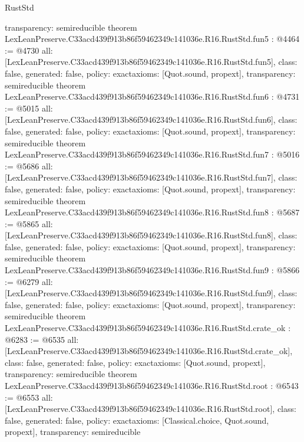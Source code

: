 \begin{lexlean}{RustStd}
\begin{coremodule}
{  transparency: semireducible
}
theorem LexLeanPreserve.C33acd439f913b86f59462349c141036e.R16.RustStd.fun5 : @4464 := @4730 {
  all: [LexLeanPreserve.C33acd439f913b86f59462349c141036e.R16.RustStd.fun5],
  class: false,
  generated: false,
  policy: exact{axioms: [Quot.sound, propext]},
  transparency: semireducible
}
theorem LexLeanPreserve.C33acd439f913b86f59462349c141036e.R16.RustStd.fun6 : @4731 := @5015 {
  all: [LexLeanPreserve.C33acd439f913b86f59462349c141036e.R16.RustStd.fun6],
  class: false,
  generated: false,
  policy: exact{axioms: [Quot.sound, propext]},
  transparency: semireducible
}
theorem LexLeanPreserve.C33acd439f913b86f59462349c141036e.R16.RustStd.fun7 : @5016 := @5686 {
  all: [LexLeanPreserve.C33acd439f913b86f59462349c141036e.R16.RustStd.fun7],
  class: false,
  generated: false,
  policy: exact{axioms: [Quot.sound, propext]},
  transparency: semireducible
}
theorem LexLeanPreserve.C33acd439f913b86f59462349c141036e.R16.RustStd.fun8 : @5687 := @5865 {
  all: [LexLeanPreserve.C33acd439f913b86f59462349c141036e.R16.RustStd.fun8],
  class: false,
  generated: false,
  policy: exact{axioms: [Quot.sound, propext]},
  transparency: semireducible
}
theorem LexLeanPreserve.C33acd439f913b86f59462349c141036e.R16.RustStd.fun9 : @5866 := @6279 {
  all: [LexLeanPreserve.C33acd439f913b86f59462349c141036e.R16.RustStd.fun9],
  class: false,
  generated: false,
  policy: exact{axioms: [Quot.sound, propext]},
  transparency: semireducible
}
theorem LexLeanPreserve.C33acd439f913b86f59462349c141036e.R16.RustStd.crate_ok : @6283 := @6535 {
  all: [LexLeanPreserve.C33acd439f913b86f59462349c141036e.R16.RustStd.crate_ok],
  class: false,
  generated: false,
  policy: exact{axioms: [Quot.sound, propext]},
  transparency: semireducible
}
theorem LexLeanPreserve.C33acd439f913b86f59462349c141036e.R16.RustStd.root : @6543 := @6553 {
  all: [LexLeanPreserve.C33acd439f913b86f59462349c141036e.R16.RustStd.root],
  class: false,
  generated: false,
  policy: exact{axioms: [Classical.choice, Quot.sound, propext]},
  transparency: semireducible
}


\end{coremodule}
\end{lexlean}

